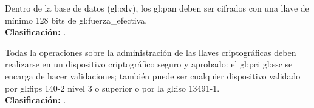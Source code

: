 {
  Dentro de la base de datos (\gls{gl:cdv}), los \gls{gl:pan} deben ser
  cifrados con una llave de mínimo 128 bits de \gls{gl:fuerza_efectiva}. \\
  \nopagebreak[4]
  \textbf{Clasificación:} .
}

{
  Todas la operaciones sobre la administración de las llaves criptográficas
  deben realizarse en un dispositivo criptográfico seguro y aprobado: el
  \gls{gl:pci} \gls{gl:ssc} se encarga de hacer validaciones; también puede ser
  cualquier dispositivo validado por \gls{gl:fips} 140-2 nivel 3 o superior
  \cite{nist_modulos_criptograficos} o por la \gls{gl:iso} 13491-1. \\
  \nopagebreak[4]
  \textbf{Clasificación:} .
}
